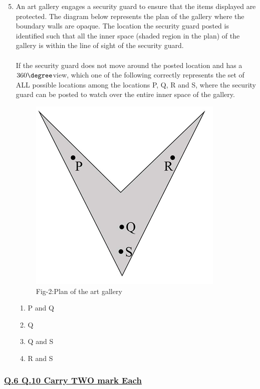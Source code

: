 \documentclass[journal]{IEEEtran}
\theoremstyle{remark}
\begin{document}
\begin{enumerate}[itemsep=1em]
\setcounter{enumi}{4}
\item An art gallery engages a security guard to ensure that the items displayed are protected. The diagram below represents the plan of the gallery where the boundary walls are opaque. The location the security guard posted is identified such that all the inner space (shaded region in the plan) of the gallery is within the line of sight of the security guard.\\
\\
If the security guard does not move around the posted location and has a $360\degree$view, which one of the following correctly represents the set of ALL possible locations among the locations P, Q, R and S, where the security guard can be posted to watch over the entire inner space of the gallery.  
\begin{figure}[H]
    \centering
    \includegraphics[width=0.3\columnwidth]{figs/fig-2.jpeg}
    \caption*{Fig-2:Plan of the art gallery}
    \label{fig-2}
\end{figure}
\begin{multicols}{4}
\begin{enumerate}
     \item P and Q
     \item Q
     \item Q and S
     \item R and S
\end{enumerate}
\end{multicols}
\end{enumerate}
\newpage
\vspace*{0.25cm}
\subsubsection{\underline{Q.6 \text{-} Q.10 Carry TWO mark Each}}
\setlength{\parskip}{1em}
\end{document}
